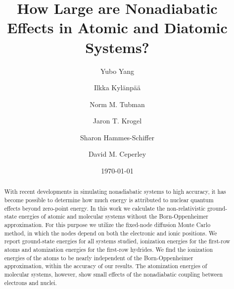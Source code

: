 \documentclass[aip,jcp,numerical,reprint]{revtex4-1}
\begin{document}
\title{How Large are Nonadiabatic Effects in Atomic and Diatomic Systems?}
\author{Yubo Yang}
\author{Ilkka Kyl\"{a}np\"{a}\"{a}}
\author{Norm M. Tubman}
\author{Jaron T. Krogel}
\author{Sharon Hammes-Schiffer}
\author{David M. Ceperley}
\date{\today}

\begin{abstract}
With recent developments in simulating nonadiabatic systems to high accuracy, it has become possible to determine how much energy is attributed to nuclear quantum effects beyond zero-point energy. In this work we calculate the non-relativistic ground-state energies of atomic and molecular systems without the Born-Oppenheimer approximation. For this purpose we utilize the fixed-node diffusion Monte Carlo method, in which the nodes depend on both the electronic and ionic positions. We report ground-state energies for all systems studied, ionization energies for the first-row atoms and atomization energies for the first-row hydrides. We find the ionization energies of the atoms to be nearly independent of the Born-Oppenheimer approximation, within the accuracy of our results. The atomization energies of molecular systems, however, show small effects of the nonadiabatic coupling between electrons and nuclei.
\end{abstract}
\maketitle
\end{document}

